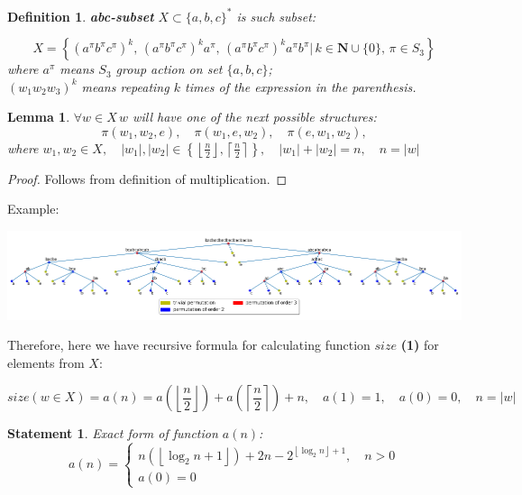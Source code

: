 \documentclass{article}
\newtheorem{definition}{Definition}[section]
\newtheorem{statement}{Statement}[section]
\newtheorem{lemma}[theorem]{Lemma}
\begin{document}
\begin{definition}
	\textbf{abc-subset} $X \subset  \{a, b, c\}^*$ is such subset: 
	
	\begin{equation}
		 X = \left\{ (a^\pi b^\pi c^\pi)^k, \, (a^\pi b^\pi c^\pi)^k a^\pi, \, (a^\pi b^\pi c^\pi)^k a^\pi b^\pi  |\, k \in \mathbf{N}\cup\{0\}, \, \pi \in S_3   \right\}
	\end{equation}
	where $a^\pi$ means $S_3$ group action on set $\{a, b, c\}$; \\
	$(w_1 w_2 w_3)^k$ means repeating $k$ times of the expression in the parenthesis.
	\\
	
\end{definition}

\begin{lemma}
	$\forall w \in X \, w$ will have one of the next possible structures:
	$$\pi (w_1, w_2, e), \quad \pi(w_1, e, w_2), \quad \pi(e, w_1, w_2), $$
	where $w_1, w_2 \in X, \quad |w_1|, |w_2| \in
	\left\{
	\left\lfloor
	\frac{n}{2}
	\right\rfloor,
	\left\lceil
	\frac{n}{2}
	\right\rceil
	\right\}, \quad |w_1| + |w_2| = n, \quad n = |w|$
	\\
\end{lemma}

\begin{proof}
	Follows from definition of multiplication.
\end{proof}

Example: 

\includegraphics[scale=0.5]{../graphs/max_size_tree.png}

Therefore, here we have recursive formula for calculating function $size$ \textbf{(1)} for elements from $X$:

$$size(w \in X) = a (n) = a \left(
    \left\lfloor
        \frac{n}{2}
    \right\rfloor
\right)
+ a \left(
    \left\lceil
        \frac{n}{2}
    \right\rceil
\right) + n, \quad a(1) = 1, \quad a(0) = 0, \quad n = |w|
$$

\begin{statement}
	Exact form of function $a(n)$:
	\begin{equation}
		 a(n) = \begin{cases}
		 n \left(\left\lfloor \log_2 n + 1 \right\rfloor\right) + 2n - 2^{\left\lfloor\log_2 n\right\rfloor + 1}, \quad n > 0 \\
		 a(0) = 0
		 \end{cases}
	\end{equation}
\end{statement}
\end{document}
